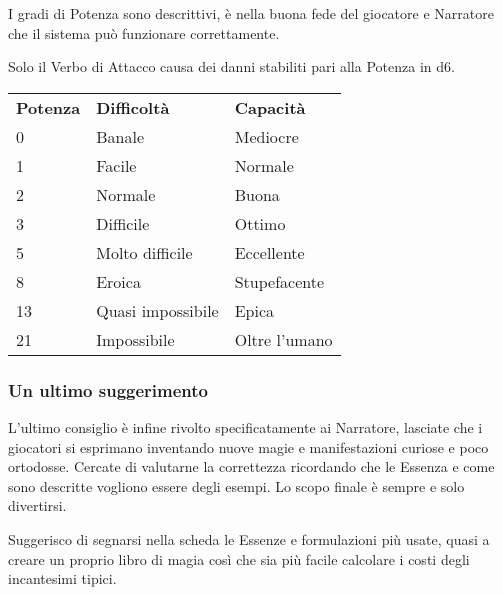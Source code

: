 \documentclass[a4paper,twoside,openany]{book}
\begin{document}
\begin{multicols}{2}
I gradi di Potenza sono descrittivi, è nella buona fede del giocatore e Narratore che il sistema può funzionare correttamente.

Solo il Verbo di Attacco causa dei danni stabiliti pari alla Potenza in d6.

\medskip

\begin{tabularx}{0.45\textwidth}{lll}
	\toprule
\textbf{Potenza}	&	\textbf{Difficoltà} & \textbf{Capacità}\\

0       & Banale	        & Mediocre	\\
1       & Facile    	    & Normale	\\
2       & Normale       	& Buona		\\
3       & Difficile        	& Ottimo	\\
5       & Molto difficile  	& Eccellente	\\
8       & Eroica    	   	& Stupefacente	\\
13      & Quasi impossibile & Epica	\\
21      & Impossibile     	& Oltre l'umano	\\
\end{tabularx}


\subsubsection{Un ultimo suggerimento}

L'ultimo consiglio è infine rivolto specificatamente ai Narratore, lasciate che i giocatori si esprimano inventando nuove magie e manifestazioni curiose e poco ortodosse. Cercate di valutarne la correttezza ricordando che le Essenza e come sono descritte vogliono essere degli esempi. Lo scopo finale è sempre e solo divertirsi.


\bigskip

Suggerisco di segnarsi nella scheda le Essenze e formulazioni più usate, quasi a creare un proprio libro di magia così che sia più facile calcolare i costi degli incantesimi tipici.




\end{multicols}
\end{document}
